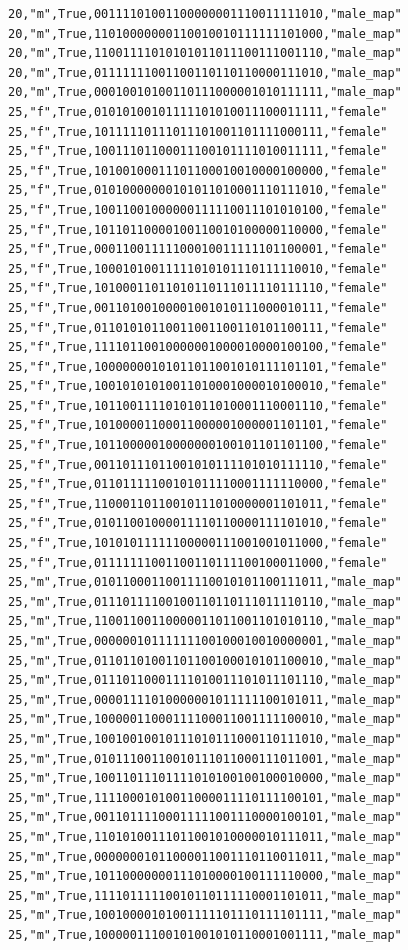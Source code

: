 \documentclass[authoryearcitations]{UoYCSproject}
\begin{document}
\begin{framed}
\begin{verbatim}
20,"m",True,00111101001100000001110011111010,"male_map"
20,"m",True,11010000000110010010111111101000,"male_map"
20,"m",True,11001111010101011011100111001110,"male_map"
20,"m",True,01111111001100110110110000111010,"male_map"
20,"m",True,00010010100110111000001010111111,"male_map"
25,"f",True,01010100101111101010011100011111,"female"
25,"f",True,10111110111011101001101111000111,"female"
25,"f",True,10011101100011100101111010011111,"female"
25,"f",True,10100100011101100010010000100000,"female"
25,"f",True,01010000000101011010001110111010,"female"
25,"f",True,10011001000000111110011101010100,"female"
25,"f",True,10110110000100110010100000110000,"female"
25,"f",True,00011001111100010011111101100001,"female"
25,"f",True,10001010011111010101110111110010,"female"
25,"f",True,10100011011010110111011110111110,"female"
25,"f",True,00110100100001001010111000010111,"female"
25,"f",True,01101010110011001100110101100111,"female"
25,"f",True,11110110010000001000010000100100,"female"
25,"f",True,10000000101011011001010111101101,"female"
25,"f",True,10010101010011010001000010100010,"female"
25,"f",True,10110011110101011010001110001110,"female"
25,"f",True,10100001100011000001000001101101,"female"
25,"f",True,10110000010000000100101101101100,"female"
25,"f",True,00110111011001010111101010111110,"female"
25,"f",True,01101111100101011110001111110000,"female"
25,"f",True,11000110110010111010000001101011,"female"
25,"f",True,01011001000011110110000111101010,"female"
25,"f",True,10101011111100000111001001011000,"female"
25,"f",True,01111111001100110111100100011000,"female"
25,"m",True,01011000110011110010101100111011,"male_map"
25,"m",True,01110111100100110110111011110110,"male_map"
25,"m",True,11001100110000011011001101010110,"male_map"
25,"m",True,00000010111111100100010010000001,"male_map"
25,"m",True,01101101001101100100010101100010,"male_map"
25,"m",True,01110110001111010011101011101110,"male_map"
25,"m",True,00001111010000001011111100101011,"male_map"
25,"m",True,10000011000111100011001111100010,"male_map"
25,"m",True,10010010010111010111000110111010,"male_map"
25,"m",True,01011100110010111011000111011001,"male_map"
25,"m",True,10011011101111010100100100010000,"male_map"
25,"m",True,11110001010011000011110111100101,"male_map"
25,"m",True,00110111100011111001110000100101,"male_map"
25,"m",True,11010100111011001010000010111011,"male_map"
25,"m",True,00000001011000011001110110011011,"male_map"
25,"m",True,10110000000111010000100111110000,"male_map"
25,"m",True,11110111110010110111110001101011,"male_map"
25,"m",True,10010000101001111101110111101111,"male_map"
25,"m",True,10000011100101001010110001001111,"male_map"

\end{verbatim}
\end{framed}
\end{document}
